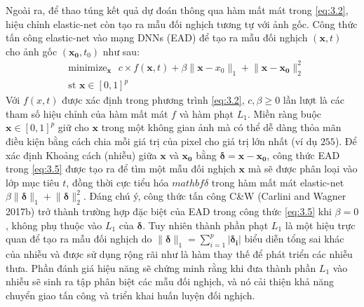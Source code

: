 Ngoài ra, để thao túng kết quả dự đoán thông qua hàm mất mát trong \ref{eq:3.2}, hiệu chỉnh 
elastic-net còn tạo ra mẫu đối nghịch tương tự với ảnh gốc. Công thức tấn công elastic-net
vào mạng DNNs (EAD) để tạo ra mẫu đối nghịch $(\mathbf{x},t)$ cho ảnh gốc $(\mathbf{x_0}, t_0)$ như sau:
\begin{equation}
    \label{eq:3.5}
    \begin{split}
    &\text{minimize}_{\mathbf{x}} \text{ }
    c \times f(\mathbf{x}, t) + \beta \lVert \mathbf{x} - x_0 \rVert_1
    + \lVert \mathbf{x} - \mathbf{x_0} \rVert_2^2 \\
    &\text{st   } \mathbf{x} \in [0,1]^p
    \end{split}
\end{equation}
Với $f(x,t)$ được xác định trong phương trình \ref{eq:3.2}, $c, \beta \geq 0$ lần lượt 
là các tham số  hiệu chỉnh của hàm mất mát $f$ và hàm phạt $L_1$. Miền ràng buộc 
$\mathbf{x} \in [0,1]^p$ giữ cho $\mathbf{x}$ trong một không gian ảnh mà có thể dễ dàng thỏa mãn điều kiện
bằng cách chia mỗi giá trị của pixel cho giá trị lớn nhất (ví dụ $255$). Để xác định Khoảng 
cách (nhiễu) giữa $\mathbf{x}$ và $\mathbf{x_0}$ bằng $\mathbf{\delta} = \mathbf{x} - \mathbf{x_0}$,
công thức EAD trong \ref{eq:3.5} được tạo ra để tìm một mẫu đối nghịch $\mathbf{x}$ mà sẽ 
được phân loại vào lớp mục tiêu $t$, đồng thời cực tiểu hóa $mathbf{\delta}$ trong hàm
mất mát elastic-net $\beta \lVert \mathbf{\delta} \rVert_1 + \lVert \mathbf{\delta} \rVert_2^2$.
Đáng chú ý, công thức tấn công C\&W (Carlini and Wagner 2017b) trở thành trường hợp đặc biệt 
của EAD trong công thức \ref{eq:3.5} khi $\beta = 0$ , không phụ thuộc vào $L_1$ của $\mathbf{\delta}$.
Tuy nhiên thành phần phạt $L_1$ là một hiệu trực quan để tạo ra mẫu đối nghịch do 
$\lVert \mathbf{\delta} \rVert_1 = \sum_{i=1}^p |\mathbf{\delta_i}|$ biểu diễn tổng sai khác
của nhiễu và được sử dụng rộng rãi như là hàm thay thế để phát triển các nhiễu thưa. 
Phần đánh giá hiệu năng sẽ chứng minh rằng khi đưa thành phần $L_1$ vào nhiễu sẽ sinh ra 
tập phân biệt các mẫu đối nghịch, và nó cải thiện khả năng chuyển giao tấn công và triển 
khai huấn luyện đối nghịch.

